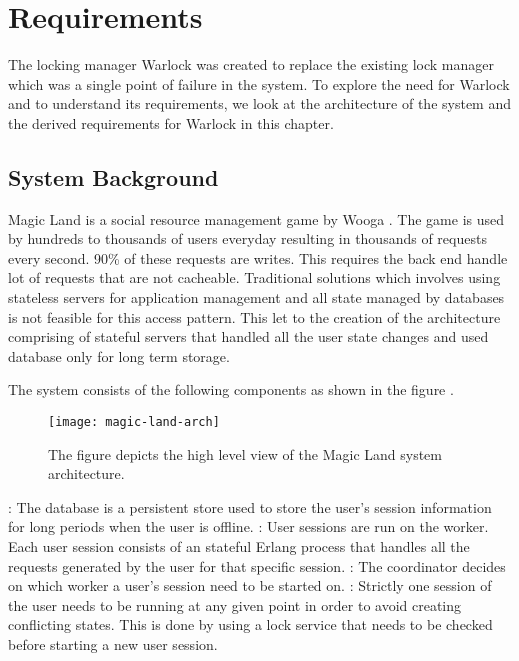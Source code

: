 \chapter{Requirements}
\label{chapter:requirements}

The locking manager Warlock was created to replace the existing lock manager
which was a single point of failure in the system. To explore the need for
Warlock and to understand its requirements, we look at the architecture of
the system and the derived requirements for Warlock in this chapter.

\section{System Background}

Magic Land \citep{magicland} is a social%
resource management game by Wooga%
. The game is used by hundreds to thousands of users everyday resulting in
thousands of  requests every second. 90\% of these requests are
writes. This requires the back end%
handle lot of requests that are not cacheable. Traditional solutions which
involves using stateless servers for application management and all state
managed
by databases is not feasible for this access pattern. This let to the creation
of the architecture comprising of stateful servers that handled all the user
state changes and used database only for long term storage.

The system consists of the following components as shown in the figure
.

\begin{figure}
  \texttt{[image: magic-land-arch]}
  \caption[Magic Land Architecture]{%
    The figure depicts the high level view of the Magic Land system
    architecture.}
    \label{figure:magic.land.architecture}
  \normalcaption
\end{figure}

\begin{itemize}
    : The database is a persistent store used to store the 
    user's session information for long periods when the user is offline.
    : User sessions are run on the worker. Each user session
    consists of an stateful Erlang process that handles all the requests
    generated by the user for that specific session.
    : The coordinator decides on which worker a user's
    session need to be started on.
    : Strictly one session of the user needs to be
    running at any given point in order to avoid creating conflicting states.
    This is done by using a lock service that needs to be checked before
    starting a new user session.
\end{itemize}

